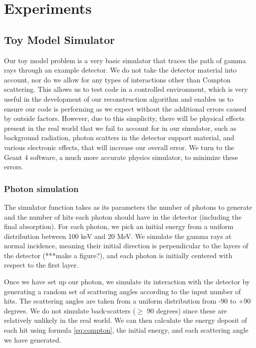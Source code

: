 \chapter{Experiments}

\section{Toy Model Simulator}
Our toy model problem is a very basic simulator that traces the path of gamma rays through an example detector. We do not take the detector material into account, nor do we allow for any types of interactions other than Compton scattering. This allows us to test code in a controlled environment, which is very useful in the development of our reconstruction algorithm and enables us to ensure our code is performing as we expect without the additional errors caused by outside factors. However, due to this simplicity, there will be physical effects present in the real world that we fail to account for in our simulator, such as background radiation, photon scatters in the detector support material, and various electronic effects, that will increase our overall error. We turn to the Geant 4 software, a much more accurate physics simulator, to minimize these errors.

\subsection{Photon simulation}
The simulator function takes as its parameters the number of photons to generate and the number of hits each photon should have in the detector (including the final absorption). For each photon, we pick an initial energy from a uniform distribution between 100 keV and 20 MeV. We simulate the gamma rays at normal incidence, meaning their initial direction is perpendicular to the layers of the detector (***make a figure?), and each photon is initially centered with respect to the first layer.

Once we have set up our photon, we simulate its interaction with the detector by generating a random set of scattering angles according to the input number of hits. The scattering angles are taken from a uniform distribution from -90 to +90 degrees. We do not simulate back-scatters ($\geq$ 90 degrees) since these are relatively unlikely in the real world. We can then calculate the energy deposit of each hit using formula \ref{eq:compton}, the initial energy, and each scattering angle we have generated.

